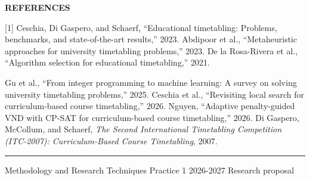 \documentclass[10pt]{article}
\newcommand{\proposalheading}[1]{%
  \vspace{1.8mm}%
  {\color{wine}\sffamily\fontsize{9.8}{11.2}\selectfont\bfseries
  \MakeUppercase{#1}}\par
  \vspace{0.55mm}%
}
\begin{document}
\begin{minipage}[t][0.98\textheight][t]{\textwidth}
\proposalheading{References}
{\fontsize{7.2}{8.3}\selectfont\raggedright
[1] Ceschia, Di Gaspero, and Schaerf, ``Educational timetabling: Problems, benchmarks, and state-of-the-art results,'' 2023. \quad
[2] Abdipoor et al., ``Metaheuristic approaches for university timetabling problems,'' 2023. \quad
[3] De la Rosa-Rivera et al., ``Algorithm selection for educational timetabling,'' 2021.\par
[4] Gu et al., ``From integer programming to machine learning: A survey on solving university timetabling problems,'' 2025. \quad
[5] Ceschia et al., ``Revisiting local search for curriculum-based course timetabling,'' 2026. \quad
[6] Nguyen, ``Adaptive penalty-guided VND with CP-SAT for curriculum-based course timetabling,'' 2026. \quad
[7] Di Gaspero, McCollum, and Schaerf, \textit{The Second International Timetabling Competition (ITC-2007): Curriculum-Based Course Timetabling}, 2007.}

\vfill
{\color{rulegray}\rule{\linewidth}{0.55pt}}\vspace{0.6mm}
{\color{muted}\sffamily\fontsize{7.1}{8.2}\selectfont
Methodology and Research Techniques \textbar{} Practice 1 \textbar{} 2026-2027
\hfill Research proposal}

\end{minipage}
\end{document}
